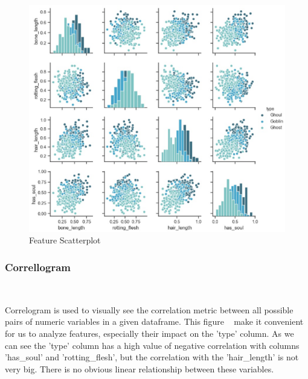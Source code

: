 \begin{figure}[htbp]
	\centering
	\includegraphics[scale=0.4]{figures/pairplot.eps}
	\caption{Feature Scatterplot}\label{fig:feature_scatterplot}
\end{figure}

\subsubsection{Correllogram}
\

Correlogram is used to 
visually see the correlation metric 
between all possible pairs of numeric variables 
in a given dataframe. 
This figure ~ 
make it convenient for us to analyze features,
especially their impact on the 'type' column. 
As we can see the 'type' column 
has a high value of negative correlation 
with columns 'has_soul' and 'rotting_flesh',
but the correlation 
with the 'hair_length' is not very big.
There is no obvious linear relationship 
between these variables.

